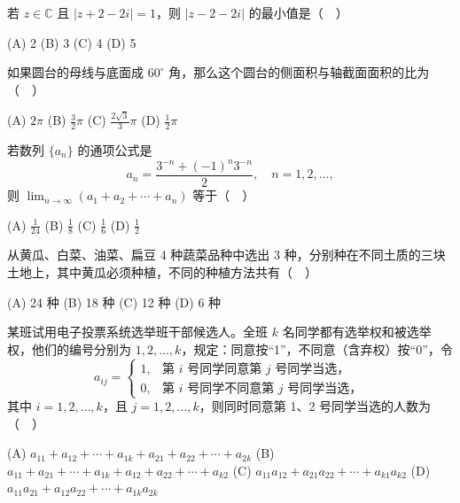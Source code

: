 \begin{question}
若 \(z\in\mathbb C\) 且 \(|z+2-2i|=1\)，则 \(|z-2-2i|\) 的最小值是（　）

    (A) 2
    (B) 3
    (C) 4
    (D) 5

\end{question}
\begin{question}
如果圆台的母线与底面成 \(60^\circ\) 角，那么这个圆台的侧面积与轴截面面积的比为（　）

    (A) \(2\pi\)
    (B) \(\frac32\pi\)
    (C) \(\frac{2\sqrt3}{3}\pi\)
    (D) \(\frac12\pi\)

\end{question}
\begin{question}
若数列 \(\{a_n\}\) 的通项公式是
\nopagebreak[4]
\[
a_n=\frac{3^{-n}+(-1)^n3^{-n}}2,\quad n=1,2,\ldots,
\]
则 \(\displaystyle\lim_{n\to\infty}(a_1+a_2+\cdots+a_n)\) 等于（　）

    (A) \(\frac1{24}\)
    (B) \(\frac18\)
    (C) \(\frac16\)
    (D) \(\frac12\)

\end{question}
\begin{question}
从黄瓜、白菜、油菜、扁豆 4 种蔬菜品种中选出 3 种，分别种在不同土质的三块土地上，其中黄瓜必须种植，不同的种植方法共有（　）

    (A) 24 种
    (B) 18 种
    (C) 12 种
    (D) 6 种

\end{question}
\begin{question}
某班试用电子投票系统选举班干部候选人。全班 \(k\) 名同学都有选举权和被选举权，他们的编号分别为 \(1,2,\ldots,k\)，规定：同意按“1”，不同意（含弃权）按“0”，令
\nopagebreak[4]
\[
a_{ij}=\begin{cases}
1,&\text{第 }i\text{ 号同学同意第 }j\text{ 号同学当选，}\\
0,&\text{第 }i\text{ 号同学不同意第 }j\text{ 号同学当选，}
\end{cases}
\]
其中 \(i=1,2,\ldots,k\)，且 \(j=1,2,\ldots,k\)，则同时同意第 1、2 号同学当选的人数为（　）

    (A) \(a_{11}+a_{12}+\cdots+a_{1k}+a_{21}+a_{22}+\cdots+a_{2k}\)
    (B) \(a_{11}+a_{21}+\cdots+a_{1k}+a_{12}+a_{22}+\cdots+a_{k2}\)
    (C) \(a_{11}a_{12}+a_{21}a_{22}+\cdots+a_{k1}a_{k2}\)
    (D) \(a_{11}a_{21}+a_{12}a_{22}+\cdots+a_{1k}a_{2k}\)

\end{question}

